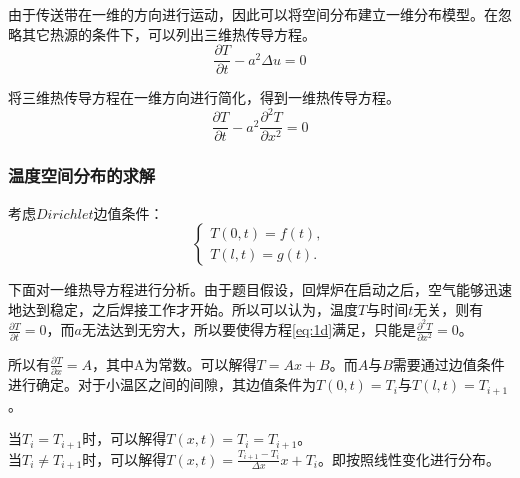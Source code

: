 \documentclass[withoutpreface,bwprint]{cumcmthesis} %
\begin{document}
由于传送带在一维的方向进行运动，因此可以将空间分布建立一维分布模型。在忽略其它热源的条件下，可以列出三维热传导方程。
\begin{equation}
\frac{\partial T}{\partial t} - a^2\Delta u = 0
\label{eq:3d}
\end{equation}

将三维热传导方程在一维方向进行简化，得到一维热传导方程。
\begin{equation}
\frac{\partial T}{\partial t} - a^2\frac{\partial ^2T}{\partial x^2} = 0
\label{eq:1d}
\end{equation}

\subsubsection{温度空间分布的求解}
考虑$Dirichlet$边值条件：
\[
	\begin{cases}
	T(0, t) = f(t),\\
	T(l, t) = g(t).
	\end{cases}
\]

下面对一维热导方程进行分析。由于题目假设，回焊炉在启动之后，空气能够迅速地达到稳定，之后焊接工作才开始。所以可以认为，温度$T$与时间$t$无关，则有$\frac{\partial T}{\partial t}=0$，而$a$无法达到无穷大，所以要使得方程\cref{eq:1d}满足，只能是$\frac{\partial ^2T}{\partial x^2} =0$。

所以有$\frac{\partial T}{\partial x} =A$，其中A为常数。可以解得$T = Ax+B$。而$A$与$B$需要通过边值条件进行确定。对于小温区之间的间隙，其边值条件为$T(0, t) = T_i$与$T(l, t) = T_{i+1}$。

当$T_i = T_{i+1}$时，可以解得$T(x, t) = T_i = T_{i+1}$。\\
当$T_i \neq T_{i+1}$时，可以解得$T(x, t) = \frac{T_{i+1}-T_{i}}{\Delta x} x + T_i$。即按照线性变化进行分布。
\end{document}

